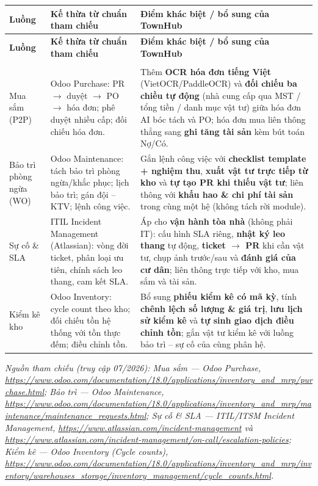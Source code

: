 {\small\singlespacing\renewcommand{\arraystretch}{1.3}
\begin{longtable}{|>{\raggedright\arraybackslash}p{2.6cm}|>{\raggedright\arraybackslash}p{5.0cm}|>{\raggedright\arraybackslash}p{6.4cm}|}
\hline
\textbf{Luồng} & \textbf{Kế thừa từ chuẩn tham chiếu} & \textbf{Điểm khác biệt / bổ sung của TownHub} \\ \hline
\endfirsthead
\hline
\textbf{Luồng} & \textbf{Kế thừa từ chuẩn tham chiếu} & \textbf{Điểm khác biệt / bổ sung của TownHub} \\ \hline
\endhead
\hline \multicolumn{3}{r}{\footnotesize\textit{(tiếp trang sau)}} \\
\endfoot
\endlastfoot
Mua sắm (P2P) & Odoo Purchase: PR $\rightarrow$ duyệt $\rightarrow$ PO $\rightarrow$ hóa đơn; phê duyệt nhiều cấp; đối chiếu hóa đơn. & Thêm \textbf{OCR hóa đơn tiếng Việt} (VietOCR/PaddleOCR) và \textbf{đối chiếu ba chiều tự động} (nhà cung cấp qua MST / tổng tiền / danh mục vật tư) giữa hóa đơn AI bóc tách và PO; hóa đơn mua liên thông thẳng sang \textbf{ghi tăng tài sản} kèm bút toán Nợ/Có. \\ \hline
Bảo trì phòng ngừa (WO) & Odoo Maintenance: tách bảo trì phòng ngừa/khắc phục; lịch bảo trì; gán đội – KTV; lệnh công việc. & Gắn lệnh công việc với \textbf{checklist template + nghiệm thu}, \textbf{xuất vật tư trực tiếp từ kho} và \textbf{tự tạo PR khi thiếu vật tư}; liên thông với \textbf{khấu hao \& chi phí tài sản} trong cùng một hệ (không tách rời module). \\ \hline
Sự cố \& SLA & ITIL Incident Management (Atlassian): vòng đời ticket, phân loại ưu tiên, chính sách leo thang, cam kết SLA. & Áp cho \textbf{vận hành tòa nhà} (không phải IT): cấu hình SLA riêng, \textbf{nhật ký leo thang} tự động, \textbf{ticket $\rightarrow$ PR} khi cần vật tư, chụp ảnh trước/sau và \textbf{đánh giá của cư dân}; liên thông trực tiếp với kho, mua sắm và tài sản. \\ \hline
Kiểm kê kho & Odoo Inventory: cycle count theo kho; đối chiếu tồn hệ thống với tồn thực đếm; điều chỉnh tồn. & Bổ sung \textbf{phiếu kiểm kê có mã kỳ}, tính \textbf{chênh lệch số lượng \& giá trị}, \textbf{lưu lịch sử kiểm kê} và \textbf{tự sinh giao dịch điều chỉnh tồn}; gắn vật tư kiểm kê với luồng bảo trì – sự cố của cùng phân hệ. \\ \hline
\end{longtable}}
\noindent\textit{\small Nguồn tham chiếu (truy cập 07/2026): Mua sắm — Odoo Purchase, \url{https://www.odoo.com/documentation/18.0/applications/inventory_and_mrp/purchase.html}; Bảo trì — Odoo Maintenance, \url{https://www.odoo.com/documentation/18.0/applications/inventory_and_mrp/maintenance/maintenance_requests.html}; Sự cố \& SLA — ITIL/ITSM Incident Management, \url{https://www.atlassian.com/incident-management} và \url{https://www.atlassian.com/incident-management/on-call/escalation-policies}; Kiểm kê — Odoo Inventory (Cycle counts), \url{https://www.odoo.com/documentation/18.0/applications/inventory_and_mrp/inventory/warehouses_storage/inventory_management/cycle_counts.html}.}

